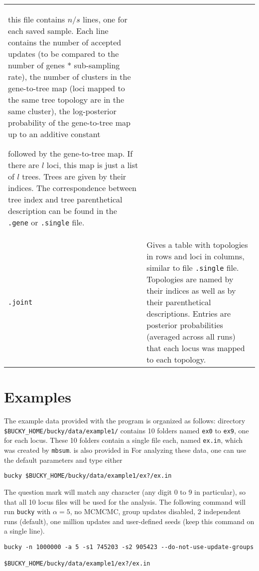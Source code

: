 \documentclass[12pt,english,final,letterpaper]{article}
\newcommand{\com}[1]{}
\begin{document}
\begin{tabular}{l|p{5.1in}}
this file contains $n/s$ lines, one for each saved sample. Each line contains 
the number of accepted updates (to be compared to the number of genes * 
sub-sampling rate), 
the number of clusters in the gene-to-tree map (loci mapped to the same 
tree topology are in the same cluster), 
the log-posterior probability of the gene-to-tree map 
up to an additive constant
\com{fixit: NOT sure at all. Bret: please check!}
followed by the gene-to-tree map. If there are $l$ loci, this map is just 
a list of $l$ trees. Trees are given by their indices. The correspondence
between tree index and tree parenthetical description can be found in the
{\tt .gene} or {\tt .single} file.\\
%
{\tt .joint}&Gives a table with topologies in rows and loci in columns,
similar to file {\tt .single} file. Topologies are 
named by their indices as well as by their parenthetical descriptions. 
Entries are posterior probabilities (averaged across all runs) 
that each locus was mapped to each topology.\\ 
\end{tabular}

\section{Examples}

The example data provided with the program is organized as follows:
directory\\ \verb+$BUCKY_HOME/bucky/data/example1/+ %
contains 10 folders named {\tt ex0} to {\tt ex9}, one for each locus. 
These 10 folders contain a single file each, named {\tt ex.in}, which was 
created by  {\tt mbsum}.
is also provided in For analyzing these data, one
can use the default parameters and type either
\begin{verbatim}
bucky $BUCKY_HOME/bucky/data/example1/ex?/ex.in
\end{verbatim}%
The question mark will match any character (any digit 0 to 9 in
particular), so that all 10 locus files will be used for the analysis.
The following command will run {\tt bucky} with 
$\alpha=5$, no MCMCMC, group updates disabled, 2 independent runs (default), 
one million updates and user-defined seeds (keep this command on a single line).

\begin{verbatim}
bucky -n 1000000 -a 5 -s1 745203 -s2 905423 --do-not-use-update-groups 
                                    $BUCKY_HOME/bucky/data/example1/ex?/ex.in
\end{verbatim}
\end{document}
